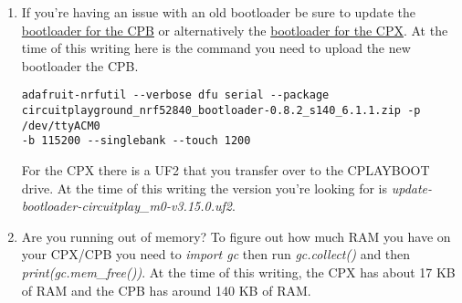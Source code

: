 \begin{enumerate}[itemsep=-5pt]
  \item If you're having an issue with an old bootloader be sure to update the \href{https://learn.adafruit.com/adafruit-circuit-playground-bluefruit/update-bootloader-use-command-line}{bootloader for the CPB} or alternatively the \href{https://learn.adafruit.com/adafruit-circuit-playground-express/updating-the-bootloader}{bootloader for the CPX}. At the time of this writing here is the command you need to upload the new bootloader the CPB.
  \begin{verbatim}adafruit-nrfutil --verbose dfu serial --package 
circuitplayground_nrf52840_bootloader-0.8.2_s140_6.1.1.zip -p /dev/ttyACM0 
-b 115200 --singlebank --touch 1200\end{verbatim}
  For the CPX there is a UF2 that you transfer over to the CPLAYBOOT drive. At the time of this writing the version you're looking for is {\it update-bootloader-circuitplay\_m0-v3.15.0.uf2}.
  \item Are you running out of memory? To figure out how much RAM you have on your CPX/CPB you need to {\it import gc} then run {\it gc.collect()} and then {\it print(gc.mem\_free())}. At the time of this writing, the CPX has about 17 KB of RAM and the CPB has around 140 KB of RAM. 

\end{enumerate}
